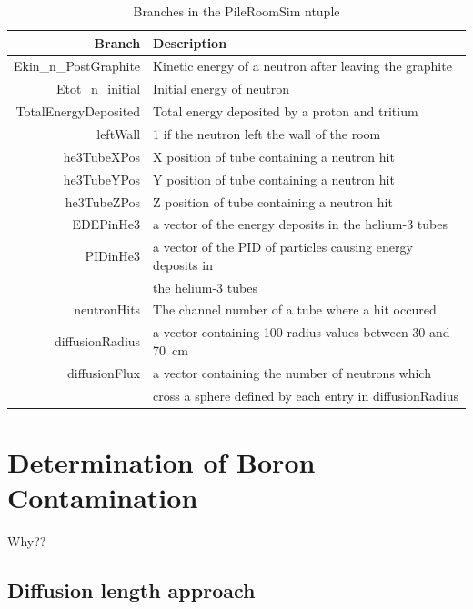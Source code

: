 \documentclass{article}
\begin{document}
	
\begin{table}
	\centering
	\begin{tabular}{ rl }
		Branch	&	Description	\\	\hline	\hline
Ekin\_n\_PostGraphite	&	Kinetic energy of a neutron after leaving the graphite	\\		
Etot\_n\_initial	&	Initial energy of neutron	\\		
TotalEnergyDeposited	&	Total energy deposited by a proton and tritium	\\		
leftWall	&	1 if the neutron left the wall of the room	\\		
he3TubeXPos	&	X position of tube containing a neutron hit	\\		
he3TubeYPos	&	Y position of tube containing a neutron hit	\\		
he3TubeZPos	&	Z position of tube containing a neutron hit	\\		
EDEPinHe3	&	a vector of the energy deposits in the helium-3 tubes	\\		
PIDinHe3	&	a vector of the PID of particles causing energy deposits in 	\\		
	&	the helium-3 tubes	\\		
neutronHits	&	The channel number of a tube where a hit occured	\\		
diffusionRadius	&	a vector containing 100 radius values between 30 and 70~cm	\\		
diffusionFlux	&	a vector containing the number of neutrons which 	\\		
	&	cross a sphere defined by each entry in diffusionRadius	\\	\hline	

	
	\end{tabular}
	\caption{Branches in the PileRoomSim ntuple}
	\label{tab:branches}
\end{table}	




\section{Determination of Boron Contamination}

	Why??
\subsection{Diffusion length approach}
\end{document}
